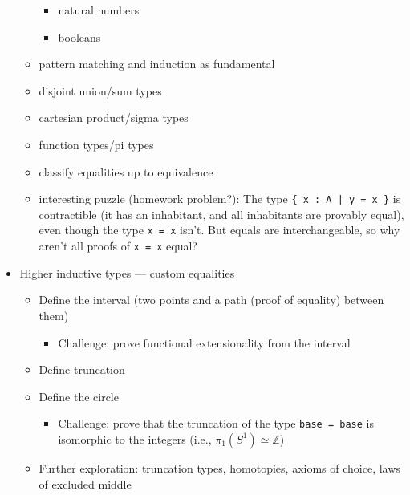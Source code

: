 \documentclass{article}
\begin{document}
\begin{itemize}
\begin{itemize}
      \begin{itemize}
        \item natural numbers
        \item booleans
      \end{itemize}
      \item pattern matching and induction as fundamental
      \item disjoint union/sum types
      \item cartesian product/sigma types
      \item function types/pi types
      \item classify equalities up to equivalence
      \item interesting puzzle (homework problem?): The type \texttt{\{ x : A | y = x \}} is contractible (it has an inhabitant, and all inhabitants are provably equal), even though the type \texttt{x = x} isn't.  But equals are interchangeable, so why aren't all proofs of \texttt{x = x} equal?
    \end{itemize}
    \item Higher inductive types --- custom equalities
    \begin{itemize}
      \item Define the interval (two points and a path (proof of equality) between them)
      \begin{itemize}
        \item Challenge: prove functional extensionality from the interval
      \end{itemize}
      \item Define truncation
      \item Define the circle
      \begin{itemize}
        \item Challenge: prove that the truncation of the type \texttt{base = base} is isomorphic to the integers (i.e., $\pi_1(S^1) \simeq \mathbb{Z}$)
      \end{itemize}
      \item Further exploration: truncation types, homotopies, axioms of choice, laws of excluded middle
  \end{itemize}
\end{itemize}
\end{document}
